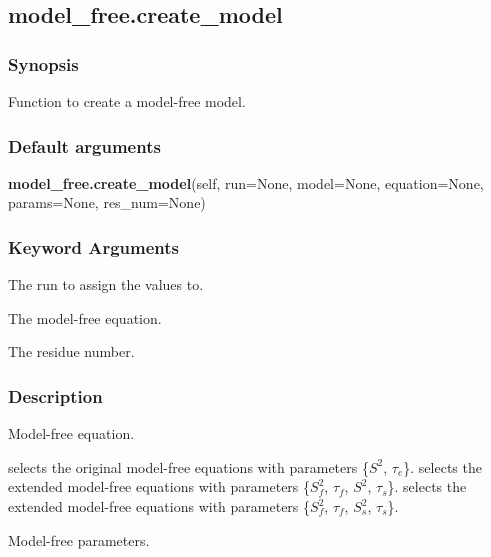 \newpage

\subsection{model\_free.create\_model}


\subsubsection{Synopsis}

Function to create a model-free model.

\subsubsection{Default arguments}

\textsf{\textbf{model\_free.create\_model}(self, run=None, model=None, equation=None, params=None, res\_num=None)}


\subsubsection{Keyword Arguments}

  The run to assign the values to.

  The model-free equation.

  The residue number.

\subsubsection{Description}

Model-free equation.

 selects the original model-free equations with parameters \{$S^2$, $\tau_e$\}.
 selects the extended model-free equations with parameters \{$S^2_f$, $\tau_f$, $S^2$, $\tau_s$\}.
 selects the extended model-free equations with parameters \{$S^2_f$, $\tau_f$, $S^2_s$, $\tau_s$\}.


Model-free parameters.

